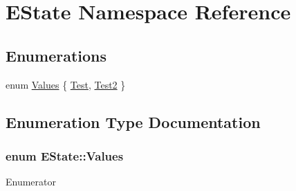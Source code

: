 \hypertarget{namespace_e_state}{\section{E\-State Namespace Reference}
\label{namespace_e_state}
}
\subsection*{Enumerations}
\begin{DoxyCompactItemize}
\item 
enum \hyperlink{namespace_e_state_aee586325ec9fecd1205d41439870dd81}{Values} \{ \hyperlink{namespace_e_state_aee586325ec9fecd1205d41439870dd81ade06ddf13aacb666de00b3a57f8b1896}{Test}, 
\hyperlink{namespace_e_state_aee586325ec9fecd1205d41439870dd81af843c6723c33e92075e2a9b925862381}{Test2}
 \}
\end{DoxyCompactItemize}


\subsection{Enumeration Type Documentation}
\hypertarget{namespace_e_state_aee586325ec9fecd1205d41439870dd81}{
\subsubsection[{Values}]{\setlength{\rightskip}{0pt plus 5cm}enum {\bf E\-State\-::\-Values}}}\label{namespace_e_state_aee586325ec9fecd1205d41439870dd81}
\begin{Desc}
\item[Enumerator]\par
\begin{description}
\item[{\em 
\hypertarget{namespace_e_state_aee586325ec9fecd1205d41439870dd81ade06ddf13aacb666de00b3a57f8b1896}{Test}\label{namespace_e_state_aee586325ec9fecd1205d41439870dd81ade06ddf13aacb666de00b3a57f8b1896}
}]\item[{\em 
\hypertarget{namespace_e_state_aee586325ec9fecd1205d41439870dd81af843c6723c33e92075e2a9b925862381}{Test2}\label{namespace_e_state_aee586325ec9fecd1205d41439870dd81af843c6723c33e92075e2a9b925862381}
}]\end{description}
\end{Desc}
